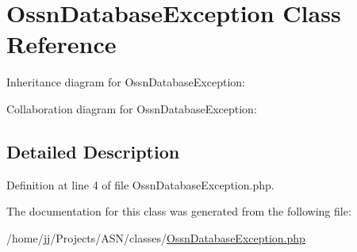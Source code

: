 \hypertarget{class_ossn_database_exception}{}\section{Ossn\+Database\+Exception Class Reference}
\label{class_ossn_database_exception}


Inheritance diagram for Ossn\+Database\+Exception\+:


Collaboration diagram for Ossn\+Database\+Exception\+:


\subsection{Detailed Description}


Definition at line 4 of file Ossn\+Database\+Exception.\+php.



The documentation for this class was generated from the following file\+:\begin{DoxyCompactItemize}
\item 
/home/jj/\+Projects/\+A\+S\+N/classes/\hyperlink{_ossn_database_exception_8php}{Ossn\+Database\+Exception.\+php}\end{DoxyCompactItemize}
